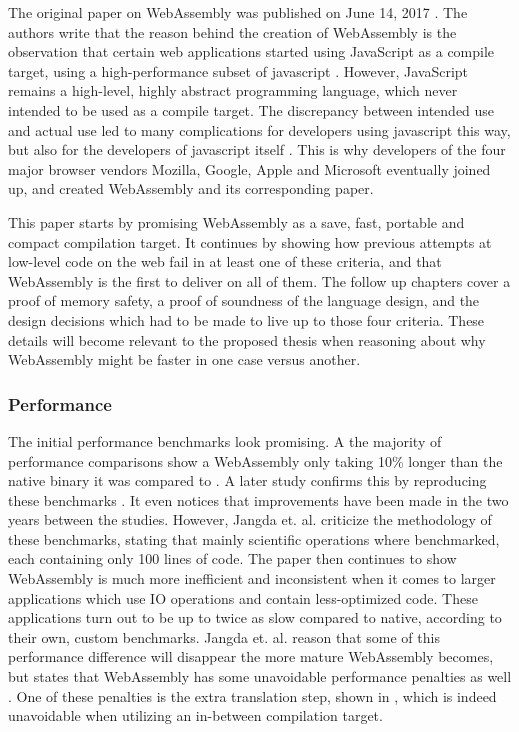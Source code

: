 The original paper on WebAssembly was published on June 14, 2017 \cite{haas_bringing_2017}. The authors write that the reason behind the creation of WebAssembly is the observation that certain web applications started using JavaScript as a compile target, using a high-performance subset of javascript \cite{mozilla_asmjs_2013}. However, JavaScript remains a high-level, highly abstract programming language, which never intended to be used as a compile target. The discrepancy between intended use and actual use led to many complications for developers using javascript this way, but also for the developers of javascript itself \cite{haas_bringing_2017}. This is why developers of the four major browser vendors Mozilla, Google, Apple and Microsoft eventually joined up, and created WebAssembly and its corresponding paper. %

This paper starts by promising WebAssembly as a save, fast, portable and compact compilation target. It continues by showing how previous attempts at low-level code on the web fail in at least one of these criteria, and that WebAssembly is the first to deliver on all of them. The follow up chapters cover a proof of memory safety, a proof of soundness of the language design, and the design decisions which had to be made to live up to those four criteria. These details will become relevant to the proposed thesis when reasoning about why WebAssembly might be faster in one case versus another.

\subsubsection*{Performance}

The initial performance benchmarks look promising. A the majority of performance comparisons show a WebAssembly only taking 10\% longer than the native binary it was compared to \cite{haas_bringing_2017}. A later study confirms this by reproducing these benchmarks \cite{jangda_not_2019}. It even notices that improvements have been made in the two years between the studies. However, Jangda et. al. criticize the methodology of these benchmarks, stating that mainly scientific operations where benchmarked, each containing only 100 lines of code. The paper then continues to show WebAssembly is much more inefficient and inconsistent when it comes to larger applications which use IO operations and contain less-optimized code. These applications turn out to be up to twice as slow compared to native, according to their own, custom benchmarks. Jangda et. al. reason that some of this performance difference will disappear the more mature WebAssembly becomes, but states that WebAssembly has some unavoidable performance penalties as well \cite{jangda_not_2019}. One of these penalties is the extra translation step, shown in , which is indeed unavoidable when utilizing an in-between compilation target. 

